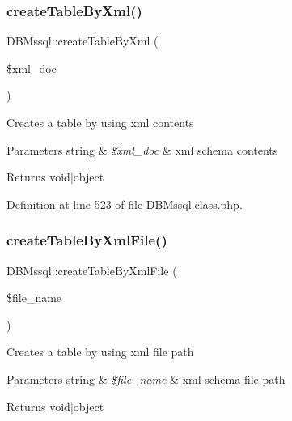 \hypertarget{classDBMssql_a7a3ff51c1a29e47c02f358dc6064d88b}{}\label{classDBMssql_a7a3ff51c1a29e47c02f358dc6064d88b} 
\subsubsection{\texorpdfstring{create\+Table\+By\+Xml()}{createTableByXml()}}
{\footnotesize\ttfamily D\+B\+Mssql\+::create\+Table\+By\+Xml (\begin{DoxyParamCaption}\item[{}]{\$xml\+\_\+doc }\end{DoxyParamCaption})}

Creates a table by using xml contents 
\begin{DoxyParams}[1]{Parameters}
string & {\em \$xml\+\_\+doc} & xml schema contents \\
\hline
\end{DoxyParams}
\begin{DoxyReturn}{Returns}
void$\vert$object 
\end{DoxyReturn}


Definition at line 523 of file D\+B\+Mssql.\+class.\+php.

\hypertarget{classDBMssql_ae136845dee2ecc1bd8fe3a7c535572f4}{}\label{classDBMssql_ae136845dee2ecc1bd8fe3a7c535572f4} 
\subsubsection{\texorpdfstring{create\+Table\+By\+Xml\+File()}{createTableByXmlFile()}}
{\footnotesize\ttfamily D\+B\+Mssql\+::create\+Table\+By\+Xml\+File (\begin{DoxyParamCaption}\item[{}]{\$file\+\_\+name }\end{DoxyParamCaption})}

Creates a table by using xml file path 
\begin{DoxyParams}[1]{Parameters}
string & {\em \$file\+\_\+name} & xml schema file path \\
\hline
\end{DoxyParams}
\begin{DoxyReturn}{Returns}
void$\vert$object 
\end{DoxyReturn}


